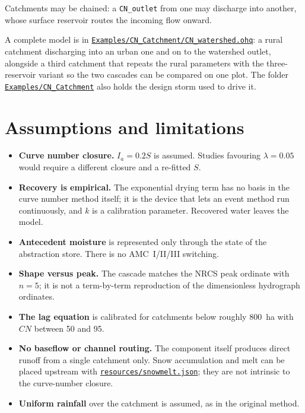 \documentclass[11pt,a4paper]{article}
\newcommand{\code}[1]{\texttt{\small #1}}
\newcommand{\file}[1]{\texttt{\small #1}}
\newcommand{\ghbase}{https://github.com/ArashMassoudieh/OpenHydroQual/blob/master}
\newcommand{\ghtree}{https://github.com/ArashMassoudieh/OpenHydroQual/tree/master}
\newcommand{\exfile}[1]{\href{\ghbase/#1}{\file{#1}}}
\newcommand{\exdir}[1]{\href{\ghtree/#1}{\file{#1}}}
\begin{document}
\noindent
Catchments may be chained: a \code{CN\_outlet} from one may discharge into
another, whose surface reservoir routes the incoming flow onward.

\medskip
\noindent
A complete model is in \exfile{Examples/CN\_Catchment/CN\_watershed.ohq}: a
rural catchment discharging into an urban one and on to the watershed outlet,
alongside a third catchment that repeats the rural parameters with the
three-reservoir variant so the two cascades can be compared on one plot. The
folder \exdir{Examples/CN\_Catchment} also holds the design storm used to drive
it.

\section{Assumptions and limitations}

\begin{itemize}[leftmargin=1.4em]
\item \textbf{Curve number closure.} $I_a=0.2S$ is assumed. Studies favouring
$\lambda=0.05$ would require a different closure and a re-fitted $S$.
\item \textbf{Recovery is empirical.} The exponential drying term has no basis
in the curve number method itself; it is the device that lets an event method
run continuously, and $k$ is a calibration parameter. Recovered water leaves
the model.
\item \textbf{Antecedent moisture} is represented only through the state of
the abstraction store. There is no AMC~I/II/III switching.
\item \textbf{Shape versus peak.} The cascade matches the NRCS peak ordinate
with $n=5$; it is not a term-by-term reproduction of the dimensionless
hydrograph ordinates.
\item \textbf{The lag equation} is calibrated for catchments below roughly
$800$~ha with $CN$ between 50 and 95.
\item \textbf{No baseflow or channel routing.} The component itself produces
direct runoff from a single catchment only. Snow accumulation and melt can be
placed upstream with \exfile{resources/snowmelt.json}; they are not intrinsic
to the curve-number closure.
\item \textbf{Uniform rainfall} over the catchment is assumed, as in the
original method.
\end{itemize}
\end{document}
